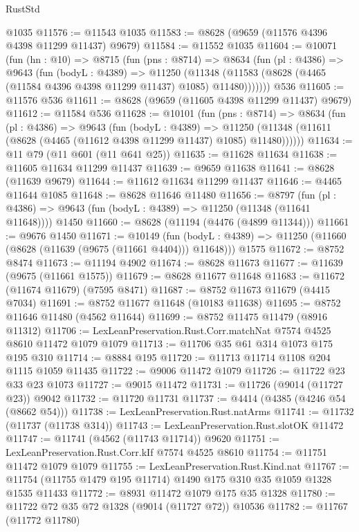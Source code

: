 \begin{lexlean}{RustStd}
\begin{coremodule}
    @1035
@11576 := @11543 @1035
@11583 := @8628 (@9659 (@11576 @4396 @4398 @11299 @11437) @9679)
@11584 := @11552 @1035
@11604 := @10071
    (fun (hn : @10) =>
    @8715
      (fun (pns : @8714) =>
      @8634
        (fun (pl : @4386) =>
        @9643
          (fun (bodyL : @4389) =>
          @11250
            (@11348 (@11583 (@8628 (@4465 (@11584 @4396 @4398 @11299 @11437) @1085) @11480)))))))
    @536
@11605 := @11576 @536
@11611 := @8628 (@9659 (@11605 @4398 @11299 @11437) @9679)
@11612 := @11584 @536
@11628 := @10101
    (fun (pns : @8714) =>
    @8634
      (fun (pl : @4386) =>
      @9643
        (fun (bodyL : @4389) =>
        @11250 (@11348 (@11611 (@8628 (@4465 (@11612 @4398 @11299 @11437) @1085) @11480))))))
@11634 := @11 @79 (@11 @601 (@11 @641 @25))
@11635 := @11628 @11634
@11638 := @11605 @11634 @11299 @11437
@11639 := @9659 @11638
@11641 := @8628 (@11639 @9679)
@11644 := @11612 @11634 @11299 @11437
@11646 := @4465 @11644 @1085
@11648 := @8628 @11646 @11480
@11656 := @8797
    (fun (pl : @4386) => @9643 (fun (bodyL : @4389) => @11250 (@11348 (@11641 @11648))))
    @1450
@11660 := @8628 (@11194 (@4476 (@4899 @11344)))
@11661 := @9676 @1450
@11671 := @10149
    (fun (bodyL : @4389) => @11250 (@11660 (@8628 (@11639 (@9675 (@11661 @4404))) @11648)))
    @1575
@11672 := @8752 @8474
@11673 := @11194 @4902
@11674 := @8628 @11673
@11677 := @11639 (@9675 (@11661 @1575))
@11679 := @8628 @11677 @11648
@11683 := @11672 (@11674 @11679) (@7595 @8471)
@11687 := @8752 @11673 @11679 (@4415 @7034)
@11691 := @8752 @11677 @11648 (@10183 @11638)
@11695 := @8752 @11646 @11480 (@4562 @11644)
@11699 := @8752 @11475 @11479 (@8916 @11312)
@11706 := LexLeanPreservation.Rust.Corr.matchNat @7574 @4525 @8610 @11472 @1079 @1079
@11713 := @11706 @35 @61 @314 @1073 @175 @195 @310
@11714 := @8884 @195
@11720 := @11713 @11714 @1108 @204 @1115 @1059 @11435
@11722 := @9006 @11472 @1079
@11726 := @11722 @23 @33 @23 @1073
@11727 := @9015 @11472
@11731 := @11726 (@9014 (@11727 @23)) @9042
@11732 := @11720 @11731
@11737 := @4414 (@4385 (@4246 @54 (@8662 @54)))
@11738 := LexLeanPreservation.Rust.natArms
@11741 := @11732 (@11737 (@11738 @314))
@11743 := LexLeanPreservation.Rust.slotOK @11472
@11747 := @11741 (@4562 (@11743 @11714)) @9620
@11751 := LexLeanPreservation.Rust.Corr.kIf @7574 @4525 @8610
@11754 := @11751 @11472 @1079 @1079
@11755 := LexLeanPreservation.Rust.Kind.nat
@11767 := @11754 (@11755 @1479 @195 @11714) @1490 @175 @310 @35 @1059 @1328 @1535 @11433
@11772 := @8931 @11472 @1079 @175 @35 @1328
@11780 := @11722 @72 @35 @72 @1328 (@9014 (@11727 @72)) @10536
@11782 := @11767 (@11772 @11780)

\end{coremodule}
\end{lexlean}
